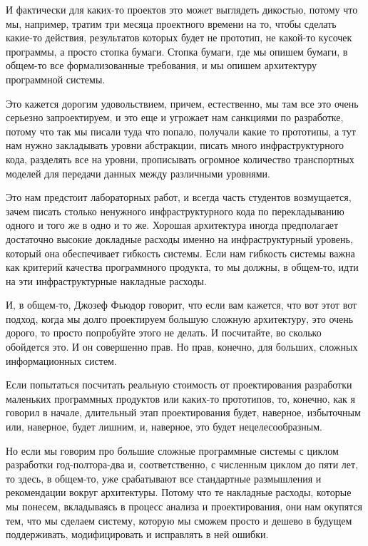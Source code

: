 И фактически для каких-то проектов это может выглядеть дикостью, потому что мы, например, тратим три месяца проектного времени на то, чтобы сделать какие-то действия, результатов которых будет не прототип, не какой-то кусочек программы, а просто стопка бумаги. Стопка бумаги, где мы опишем бумаги, в общем-то все формализованные требования, и мы опишем архитектуру программной системы.

Это кажется дорогим удовольствием, причем, естественно, мы там все это очень серьезно запроектируем, и это еще и угрожает нам санкциями по разработке, потому что так мы писали туда что попало, получали какие то прототипы, а тут нам нужно закладывать уровни абстракции, писать много инфраструктурного кода, разделять все на уровни, прописывать огромное количество транспортных моделей для передачи данных между различными уровнями.

Это нам предстоит лабораторных работ, и всегда часть студентов возмущается, зачем писать столько ненужного инфраструктурного кода по перекладыванию одного и того же в одно и то же. Хорошая архитектура иногда предполагает достаточно высокие докладные расходы именно на инфраструктурный уровень, который она обеспечивает гибкость системы. Если нам гибкость системы важна как критерий качества программного продукта, то мы должны, в общем-то, идти на эти инфраструктурные накладные расходы. 

И, в общем-то, Джозеф Фьюдор говорит, что если вам кажется, что вот этот вот подход, когда мы долго проектируем большую сложную архитектуру, это очень дорого, то просто попробуйте этого не делать. И посчитайте, во сколько обойдется это. И он совершенно прав. Но прав, конечно, для больших, сложных информационных систем. 

Если попытаться посчитать реальную стоимость от проектирования разработки маленьких программных продуктов или каких-то прототипов, то, конечно, как я говорил в начале, длительный этап проектирования будет, наверное, избыточным или, наверное, будет лишним, и, наверное, это будет нецелесообразным. 

Но если мы говорим про большие сложные программные системы с циклом разработки год-полтора-два и, соответственно, с численным циклом до пяти лет, то здесь, в общем-то, уже срабатывают все стандартные размышления и рекомендации вокруг архитектуры. Потому что те накладные расходы, которые мы понесем, вкладываясь в процесс анализа и проектирования, они нам окупятся тем, что мы сделаем систему, которую мы сможем просто и дешево в будущем поддерживать, модифицировать и исправлять в ней ошибки.

